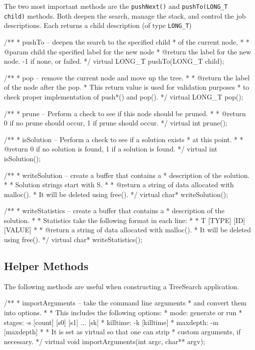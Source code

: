 \documentclass[11pt]{article}
\def\TreeSearch{{TreeSearch}}
\begin{document}
The two most important methods are the
	\texttt{pushNext()} and \texttt{pushTo(LONG\_T child)} methods.
Both deepen the search, 
	manage the stack, 
	and control the job descriptions.
Each returns a child description (of type \texttt{LONG\_T})
	
	

	/**
	 * pushTo -- deepen the search to the specified child
	 * 	of the current node.
	 *
	 * @param child the specified label for the new node
	 * @return the label for the new node. -1 if none, or failed.
	 */
	virtual LONG\_T pushTo(LONG\_T child);

	/**
	 * pop -- remove the current node and move up the tree.
	 *
	 * @return the label of the node after the pop.
	 * 		This return value is used for validation purposes
	 * 		to check proper implementation of push*() and pop().
	 */
	virtual LONG\_T pop();

	/**
	 * prune -- Perform a check to see if this node should be pruned.
	 *
	 * @return 0 if no prune should occur, 1 if prune should occur.
	 */
	virtual int prune();

	/**
	 * isSolution -- Perform a check to see if a solution exists
	 * 		at this point.
	 *
	 * @return 0 if no solution is found, 1 if a solution is found.
	 */
	virtual int isSolution();

	/**
	 * writeSolution -- create a buffer that contains a
	 * 	description of the solution.
	 *
	 * Solution strings start with S.
	 *
	 * @return a string of data allocated with malloc().
	 * 	It will be deleted using free().
	 */
	virtual char* writeSolution();

	/**
	 * writeStatistics -- create a buffer that contains a
	 * 	description of the solution.
	 *
	 * Statistics take the following format in each line:
	 *
	 * T [TYPE] [ID] [VALUE]
	 *
	 * @return a string of data allocated with malloc().
	 * 	It will be deleted using free().
	 */
	virtual char* writeStatistics();




\subsection{Helper Methods}

The following methods are useful when constructing a {\TreeSearch} application.


/**
	 * importArguments -- take the command line arguments
	 * 	and convert them into options.
	 *
	 * This includes the following options:
	 * 	mode: generate or run
	 *  stages: -s [count] [s0] [s1] ... [sk]
	 *  killtime: -k [killtime]
	 *  maxdepth: -m [maxdepth]
	 *
	 *  It is set as virtual so that one can strip
	 *   custom arguments, if necessary.
	 */
	virtual void importArguments(int argc, char** argv);
\end{document}
